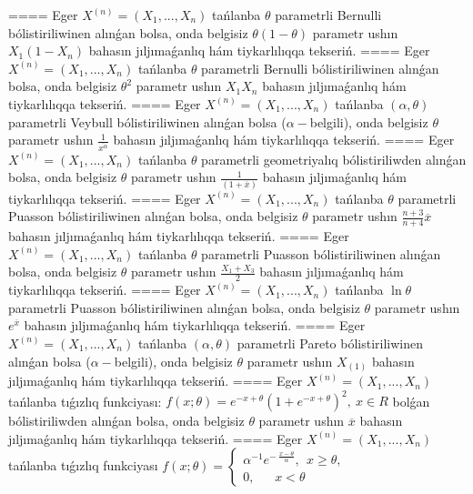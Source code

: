 ====
Eger \(X^{(n)} = \left( X_{1},...,X_{n} \right)\) tańlanba \(\theta\) parametrli Bernulli bólistiriliwinen alınǵan bolsa, onda belgisiz \(\theta(1 - \theta)\) parametr ushın \(X_{1}\left( 1 - X_{n} \right)\) bahasın jıljımaǵanlıq hám tiykarlılıqqa tekseriń.
====
Eger \(X^{(n)} = \left( X_{1},...,X_{n} \right)\) tańlanba \(\theta\) parametrli Bernulli bólistiriliwinen alınǵan bolsa, onda belgisiz \(\theta^{2}\) parametr ushın \(X_{1}X_{n}\) bahasın jıljımaǵanlıq hám tiykarlılıqqa tekseriń.
====
Eger \(X^{(n)} = \left( X_{1},...,X_{n} \right)\) tańlanba \((\alpha,\theta)\) parametrli Veybull bólistiriliwinen alınǵan bolsa (\(\alpha -\)belgili), onda belgisiz \(\theta\) parametr ushın \(\frac{1}{\overline{x^{\alpha}}}\) bahasın jıljımaǵanlıq hám tiykarlılıqqa tekseriń.
====
Eger \(X^{(n)} = \left( X_{1},...,X_{n} \right)\) tańlanba \(\theta\) parametrli geometriyalıq bólistiriliwden alınǵan bolsa, onda belgisiz \(\theta\) parametr ushın \(\frac{1}{(1 + \overline{x})}\) bahasın jıljımaǵanlıq hám tiykarlılıqqa tekseriń.
====
Eger \(X^{(n)} = \left( X_{1},...,X_{n} \right)\) tańlanba \(\theta\) parametrli Puasson bólistiriliwinen alınǵan bolsa, onda belgisiz \(\theta\) parametr ushın \(\frac{n + 3}{n + 4}\overline{x}\) bahasın jıljımaǵanlıq hám tiykarlılıqqa tekseriń.
====
Eger \(X^{(n)} = \left( X_{1},...,X_{n} \right)\) tańlanba \(\theta\) parametrli Puasson bólistiriliwinen alınǵan bolsa, onda belgisiz \(\theta\) parametr ushın \(\frac{X_{1} + X_{3}}{2}\) bahasın jıljımaǵanlıq hám tiykarlılıqqa tekseriń.
====
Eger \(X^{(n)} = \left( X_{1},...,X_{n} \right)\) tańlanba \(\ln\theta\) parametrli Puasson bólistiriliwinen alınǵan bolsa, onda belgisiz \(\theta\) parametr ushın \(e^{\overline{x}}\) bahasın jıljımaǵanlıq hám tiykarlılıqqa tekseriń.
====
Eger \(X^{(n)} = \left( X_{1},...,X_{n} \right)\) tańlanba \((\alpha,\theta)\) parametrli Pareto bólistiriliwinen alınǵan bolsa (\(\alpha -\)belgili), onda belgisiz \(\theta\) parametr ushın \(X_{(1)}\) bahasın jıljımaǵanlıq hám tiykarlılıqqa tekseriń.
====
Eger \(X^{(n)} = \left( X_{1},...,X_{n} \right)\) tańlanba tıǵızlıq funkciyası: \(f(x;\theta) = e^{- x + \theta}\left( 1 + e^{- x + \theta} \right)^{2},\ x \in R\)
bolǵan bólistiriliwden alınǵan bolsa, onda belgisiz \(\theta\) parametr ushın \(\overline{x}\) bahasın jıljımaǵanlıq hám tiykarlılıqqa tekseriń.
====
Eger \(X^{(n)} = \left( X_{1},...,X_{n} \right)\) tańlanba tıǵızlıq funkciyası
$f(x;\theta) = \left\{ \begin{array}{r}
\alpha^{- 1}e^{- \ \frac{x - \theta}{\alpha}},\ \ x \geq \theta, \\
0,\ \ \ \ \ \ \ x < \theta
\end{array} \right.\ $
